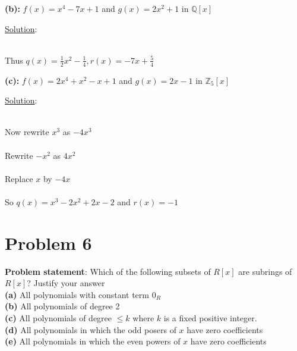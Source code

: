 \documentclass{article} %
\begin{document}
\textbf{(b): }$f(x) = x^4 - 7x + 1$ and $g(x) = 2x^2 + 1$ in $\mathbb{Q}[x]$
\begin{addmargin}[1em]{0em}
\underline{Solution}: 
\begin{addmargin}[1em]{0em}
\\Thus $q(x) = \frac{1}{2}x^2 - \frac{1}{4}, r(x) = -7x + \frac{5}{4}$
\end{addmargin}
\begin{addmargin}[1em]{0em}

\end{addmargin}
\end{addmargin}
\textbf{(c): }$f(x) = 2x^4 + x^2 - x + 1$ and $g(x) = 2x - 1$ in $\mathbb{Z}_5[x]$
\begin{addmargin}[1em]{0em}
\underline{Solution}: 
\begin{addmargin}[1em]{0em}
\\Now rewrite $x^3$ as $-4x^3$
\\ 
\\Rewrite $-x^2$ as $4x^2$
\\ 
\\Replace $x$ by $-4x$
\\ 
\\So $q(x) = x^3 -2x^2 + 2x -2$ and $r(x) = -1$
\end{addmargin}
\begin{addmargin}[1em]{0em}

\end{addmargin}
\end{addmargin}
\newpage
\section*{Problem 6}
\textbf{Problem statement}: Which of the following subsets of $R[x]$ are subrings of $R[x]$?  Justify your answer
\\ \textbf{(a)} All polynomials with constant term $0_R$
\\ \textbf{(b)} All polynomials of degree 2
\\ \textbf{(c)} All polynomials of degree $\leq k$ where $k$ is a fixed positive integer.
\\ \textbf{(d)} All polynomials in which the odd posers of $x$ have zero coefficients
\\ \textbf{(e)} All polynomials in which the even powers of $x$ have zero coefficients
\\
\end{document}
